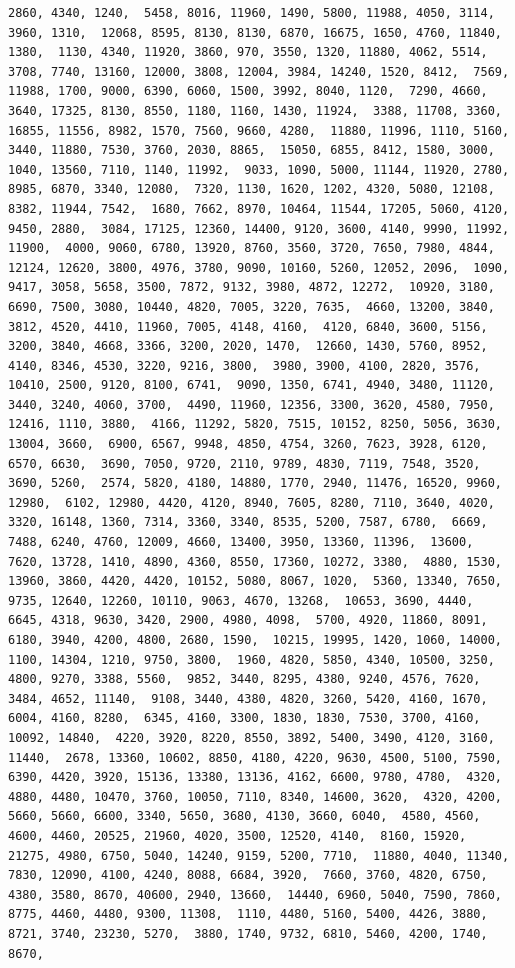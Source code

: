 \documentclass[
]{article}
\begin{document}
\begin{verbatim}
2860, 4340, 1240,  5458, 8016, 11960, 1490, 5800, 11988, 4050, 3114, 3960, 1310,  12068, 8595, 8130, 8130, 6870, 16675, 1650, 4760, 11840, 1380,  1130, 4340, 11920, 3860, 970, 3550, 1320, 11880, 4062, 5514,  3708, 7740, 13160, 12000, 3808, 12004, 3984, 14240, 1520, 8412,  7569, 11988, 1700, 9000, 6390, 6060, 1500, 3992, 8040, 1120,  7290, 4660, 3640, 17325, 8130, 8550, 1180, 1160, 1430, 11924,  3388, 11708, 3360, 16855, 11556, 8982, 1570, 7560, 9660, 4280,  11880, 11996, 1110, 5160, 3440, 11880, 7530, 3760, 2030, 8865,  15050, 6855, 8412, 1580, 3000, 1040, 13560, 7110, 1140, 11992,  9033, 1090, 5000, 11144, 11920, 2780, 8985, 6870, 3340, 12080,  7320, 1130, 1620, 1202, 4320, 5080, 12108, 8382, 11944, 7542,  1680, 7662, 8970, 10464, 11544, 17205, 5060, 4120, 9450, 2880,  3084, 17125, 12360, 14400, 9120, 3600, 4140, 9990, 11992, 11900,  4000, 9060, 6780, 13920, 8760, 3560, 3720, 7650, 7980, 4844,  12124, 12620, 3800, 4976, 3780, 9090, 10160, 5260, 12052, 2096,  1090, 9417, 3058, 5658, 3500, 7872, 9132, 3980, 4872, 12272,  10920, 3180, 6690, 7500, 3080, 10440, 4820, 7005, 3220, 7635,  4660, 13200, 3840, 3812, 4520, 4410, 11960, 7005, 4148, 4160,  4120, 6840, 3600, 5156, 3200, 3840, 4668, 3366, 3200, 2020, 1470,  12660, 1430, 5760, 8952, 4140, 8346, 4530, 3220, 9216, 3800,  3980, 3900, 4100, 2820, 3576, 10410, 2500, 9120, 8100, 6741,  9090, 1350, 6741, 4940, 3480, 11120, 3440, 3240, 4060, 3700,  4490, 11960, 12356, 3300, 3620, 4580, 7950, 12416, 1110, 3880,  4166, 11292, 5820, 7515, 10152, 8250, 5056, 3630, 13004, 3660,  6900, 6567, 9948, 4850, 4754, 3260, 7623, 3928, 6120, 6570, 6630,  3690, 7050, 9720, 2110, 9789, 4830, 7119, 7548, 3520, 3690, 5260,  2574, 5820, 4180, 14880, 1770, 2940, 11476, 16520, 9960, 12980,  6102, 12980, 4420, 4120, 8940, 7605, 8280, 7110, 3640, 4020,  3320, 16148, 1360, 7314, 3360, 3340, 8535, 5200, 7587, 6780,  6669, 7488, 6240, 4760, 12009, 4660, 13400, 3950, 13360, 11396,  13600, 7620, 13728, 1410, 4890, 4360, 8550, 17360, 10272, 3380,  4880, 1530, 13960, 3860, 4420, 4420, 10152, 5080, 8067, 1020,  5360, 13340, 7650, 9735, 12640, 12260, 10110, 9063, 4670, 13268,  10653, 3690, 4440, 6645, 4318, 9630, 3420, 2900, 4980, 4098,  5700, 4920, 11860, 8091, 6180, 3940, 4200, 4800, 2680, 1590,  10215, 19995, 1420, 1060, 14000, 1100, 14304, 1210, 9750, 3800,  1960, 4820, 5850, 4340, 10500, 3250, 4800, 9270, 3388, 5560,  9852, 3440, 8295, 4380, 9240, 4576, 7620, 3484, 4652, 11140,  9108, 3440, 4380, 4820, 3260, 5420, 4160, 1670, 6004, 4160, 8280,  6345, 4160, 3300, 1830, 1830, 7530, 3700, 4160, 10092, 14840,  4220, 3920, 8220, 8550, 3892, 5400, 3490, 4120, 3160, 11440,  2678, 13360, 10602, 8850, 4180, 4220, 9630, 4500, 5100, 7590,  6390, 4420, 3920, 15136, 13380, 13136, 4162, 6600, 9780, 4780,  4320, 4880, 4480, 10470, 3760, 10050, 7110, 8340, 14600, 3620,  4320, 4200, 5660, 5660, 6600, 3340, 5650, 3680, 4130, 3660, 6040,  4580, 4560, 4600, 4460, 20525, 21960, 4020, 3500, 12520, 4140,  8160, 15920, 21275, 4980, 6750, 5040, 14240, 9159, 5200, 7710,  11880, 4040, 11340, 7830, 12090, 4100, 4240, 8088, 6684, 3920,  7660, 3760, 4820, 6750, 4380, 3580, 8670, 40600, 2940, 13660,  14440, 6960, 5040, 7590, 7860, 8775, 4460, 4480, 9300, 11308,  1110, 4480, 5160, 5400, 4426, 3880, 8721, 3740, 23230, 5270,  3880, 1740, 9732, 6810, 5460, 4200, 1740, 8670, 
\end{verbatim}
\end{document}
